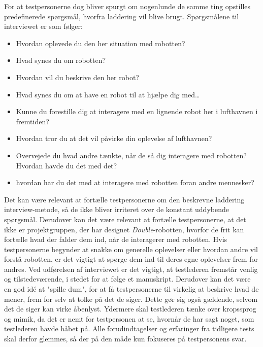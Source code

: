 For at testpersonerne dog bliver spurgt om nogenlunde de samme ting opstilles predefinerede spørgsmål, hvorfra laddering vil blive brugt. Spørgsmålene til interviewet er som følger:\blankline
\begin{itemize}
	\item Hvordan oplevede du den her situation med robotten?
	\item Hvad synes du om robotten?
	\item Hvordan vil du beskrive den her robot?
	\item Hvad synes du om at have en robot til at hjælpe dig med…
	\item Kunne du forestille dig at interagere med en lignende robot her i lufthavnen i fremtiden?
	\item Hvordan tror du at det vil påvirke din oplevelse af lufthavnen?
	\item Overvejede du hvad andre tænkte, når de så dig interagere med robotten? Hvordan havde du det med det?
	\item hvordan har du det med at interagere med robotten foran andre mennesker?\blankline
\end{itemize}
\noindent
%
Det kan være relevant at fortælle testpersonerne om den beskrevne laddering interview-metode, så de ikke bliver irriteret over de konstant uddybende spørgsmål. Derudover kan det være relevant at fortælle testpersonerne, at det ikke er projektgruppen, der har designet \textit{Double}-robotten, hvorfor de frit kan fortælle hvad der falder dem ind, når de interagerer med robotten. Hvis testpersonerne begynder at snakke om generelle oplevelser eller hvordan andre vil forstå robotten, er det vigtigt at spørge dem ind til deres egne oplevelser frem for andres. \blankline
%
Ved udførelsen af interviewet er det vigtigt, at testlederen fremstår venlig og tilstedeværende, i stedet for at følge et manuskript. Derudover kan det være en god idé at "spille dum", for at få testpersonerne til virkelig at beskrive hvad de mener, frem for selv at tolke på det de siger. Dette gør sig også gældende, selvom det de siger kan virke åbenlyst. Ydermere skal testlederen tænke over kropssprog og mimik, da det er nemt for testpersonen at se, hvornår de har sagt noget, som testlederen havde håbet på. Alle forudindtagelser og erfaringer fra tidligere tests skal derfor glemmes, så der på den måde kun fokuseres på testpersonens svar. 
